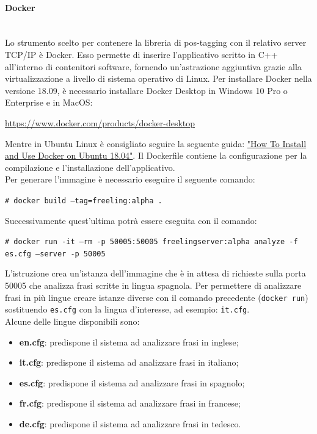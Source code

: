 \paragraph{Docker}\mbox{}\\
Lo strumento scelto per contenere la libreria di pos-tagging con il relativo server {TCP/IP} è Docker. Esso permette di inserire l'applicativo scritto in {C++} all'interno di contenitori software, fornendo un'astrazione aggiuntiva grazie alla virtualizzazione a livello di sistema operativo di Linux.
Per installare Docker nella versione 18.09, è necessario installare Docker Desktop in Windows 10 Pro o Enterprise e in MacOS:
\begin{center}
\url{https://www.docker.com/products/docker-desktop}
\end{center}
Mentre in Ubuntu Linux è consigliato seguire la seguente guida: \href{https://www.digitalocean.com/community/tutorials/how-to-install-and-use-docker-on-ubuntu-18-04}{"How To Install and Use Docker on Ubuntu 18.04"}.
Il Dockerfile contiene la configurazione per la compilazione e l'installazione dell'applicativo.\\
Per generare l'immagine è necessario eseguire il seguente comando:
\begin{center}
	\texttt{\# docker build --tag=freeling:alpha .}
\end{center}
Successivamente quest'ultima potrà essere eseguita con il comando:	
\begin{center}
	\texttt{\# docker run -it --rm -p 50005:50005 freelingserver:alpha analyze -f es.cfg --server -p 50005}
\end{center}
L'istruzione crea un'istanza dell'immagine che è in attesa di richieste sulla porta 50005 che analizza frasi scritte in lingua spagnola.
Per permettere di analizzare frasi in più lingue creare istanze diverse con il comando precedente (\texttt{docker run}) sostituendo \texttt{es.cfg} con la lingua d'interesse, ad esempio: \texttt{it.cfg}.\\
Alcune delle lingue disponibili sono: 
\begin{itemize}
	\item \textbf{en.cfg}: predispone il sistema ad analizzare frasi in inglese;
	\item \textbf{it.cfg}: predispone il sistema ad analizzare frasi in italiano;
	\item \textbf{es.cfg}: predispone il sistema ad analizzare frasi in spagnolo;
	\item \textbf{fr.cfg}: predispone il sistema ad analizzare frasi in francese;
	\item \textbf{de.cfg}: predispone il sistema ad
	analizzare frasi in tedesco.
\end{itemize}

